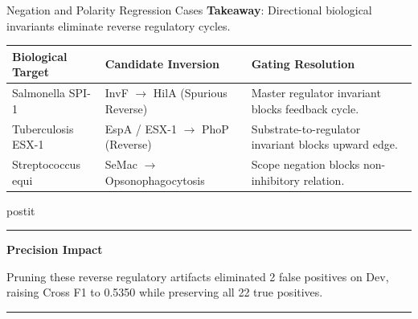 \documentclass[aspectratio=43,10pt]{beamer}
\newcommand{\card}[4][\linewidth]{%
  \begin{beamercolorbox}[wd=#1,sep=0pt,rounded=false,shadow=false]{postit}%
    {\color{#3}\rule{\linewidth}{1.5pt}}\par
    \colorbox{slatebg}{%
      \begin{minipage}{\dimexpr#1-8pt\relax}%
        \vspace{1.5pt}%
        {\footnotesize\bfseries\color{#3}#2}\vspace{1.5pt}\par%
        {\scriptsize\color{darktext}#4}%
        \vspace{1.5pt}%
      \end{minipage}%
    }%
    \par{\color{bordergray}\rule{\linewidth}{0.6pt}}%
  \end{beamercolorbox}%
}
\begin{document}
\begin{frame}{Negation and Polarity Regression Cases}
  \textbf{Takeaway}: Directional biological invariants eliminate reverse regulatory cycles.
  \vspace{0.10cm}
  \begin{center}
    \scriptsize
    \renewcommand{\arraystretch}{1.08}
    \begin{tabularx}{\linewidth}{p{2.6cm}>{\raggedright\arraybackslash}p{4.2cm}>{\raggedright\arraybackslash}X}
      \toprule
      \textbf{\color{navy}Biological Target} & \textbf{\color{navy}Candidate Inversion} & \textbf{\color{navy}Gating Resolution} \\
      \midrule
      Salmonella SPI-1 & InvF $\to$ HilA (Spurious Reverse) & Master regulator invariant blocks feedback cycle. \\
      \addlinespace[2pt]
      Tuberculosis ESX-1 & EspA / ESX-1 $\to$ PhoP (Reverse) & Substrate-to-regulator invariant blocks upward edge. \\
      \addlinespace[2pt]
      Streptococcus equi & SeMac $\to$ Opsonophagocytosis & Scope negation blocks non-inhibitory relation. \\
      \bottomrule
    \end{tabularx}
  \end{center}
  \vspace{0.06cm}
  \card{Precision Impact}{green}{
    Pruning these reverse regulatory artifacts eliminated 2 false positives on Dev, raising Cross F1 to 0.5350 while preserving all 22 true positives.
  }
\end{frame}
\end{document}
